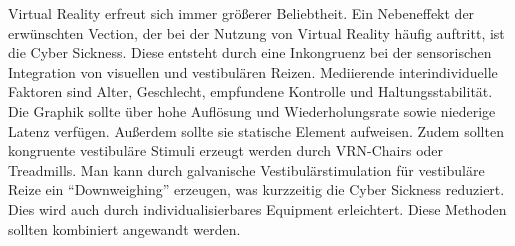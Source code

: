 Virtual Reality erfreut sich immer gr\"o{\ss}erer Beliebtheit. Ein  Nebeneffekt der erw\"unschten Vection, der bei der Nutzung von Virtual Reality h\"aufig auftritt, ist die Cyber Sickness.
Diese entsteht durch eine Inkongruenz bei der sensorischen Integration von visuellen und vestibul\"aren Reizen.
Mediierende interindividuelle Faktoren sind Alter, Geschlecht, empfundene Kontrolle und Haltungsstabilit\"at.
Die Graphik sollte \"uber hohe Aufl\"osung und Wiederholungsrate sowie niederige Latenz verf\"ugen. Au{\ss}erdem sollte sie statische Element aufweisen. Zudem sollten kongruente vestibul\"are Stimuli erzeugt werden durch VRN-Chairs oder Treadmills. Man kann durch galvanische Vestibul\"arstimulation f\"ur vestibul\"are Reize ein "`Downweighing"' erzeugen, was kurzzeitig die Cyber Sickness reduziert. Dies wird auch durch individualisierbares Equipment erleichtert. Diese Methoden sollten kombiniert angewandt werden.

